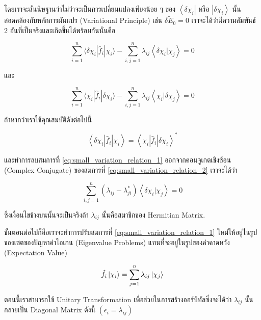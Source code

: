 \noindent โดยเราจะสันนิษฐานว่าไม่ว่าจะเป็นการเปลี่ยนแปลงเพียงน้อย ๆ ของ $\left\langle\delta \chi_i\right|$ หรือ
$\left|\delta \chi_i\right\rangle$ นั้นสอดคล้องกับหลักการผันแปร (Variational Principle) เช่น $\delta \tilde{E}_0=0$
เราจะได้ว่ามีความสัมพันธ์ 2 อันที่เป็นจริงและเกิดขึ้นได้พร้อมกันนั่นคือ

\begin{equation}
    \label{eq:small_variation_relation_1}
    \sum_{i=1}^n \langle\delta \chi_i | \hat{f}_i | \chi_i \rangle
    - \sum_{i, j=1}^n \lambda_{i j}\left\langle\delta \chi_i | \chi_j\right\rangle
    = 0
\end{equation}

\noindent และ

\begin{equation}
    \label{eq:small_variation_relation_2}
    \sum_{i=1}^n \langle\chi_i | \hat{f}_i | \delta \chi_i \rangle
    - \sum_{i, j=1}^n \lambda_{i j}\left\langle\chi_i | \delta \chi_j\right\rangle
    = 0
\end{equation}

ถ้าหากว่าเราใช้คุณสมบัติดังต่อไปนี้

\begin{equation}
    \left\langle\delta \chi_i\left|\hat{f}_i\right| \chi_i\right\rangle
    =
    \left\langle\chi_i\left|\hat{f}_i\right| \delta \chi_i\right\rangle^*
\end{equation}

\noindent และทำการลบสมการที่ \ref{eq:small_variation_relation_1} ออกจากคอนจูเกตเชิงซ้อน (Complex Conjugate) ของสมการที่
\ref{eq:small_variation_relation_2} เราจะได้ว่า

\begin{equation}
    \sum_{i, j=1}^n
    \left(\lambda_{i j}-\lambda_{j i}^*\right)
    \left\langle\delta \chi_i | \chi_j\right\rangle
    = 0
\end{equation}

\noindent ซึ่งเงื่อนไขข้างบนนั้นจะเป็นจริงถ้า $\lambda_{i j}$ นั้นคือสมาชิกของ Hermitian Matrix.

ขั้นตอนต่อไปก็คือเราจะทำการปรับสมการที่ \ref{eq:small_variation_relation_1} ใหม่ให้อยู่ในรูปของเซตของปัญหาค่าไอเกน
(Eigenvalue Problems) แทนที่จะอยู่ในรูปของค่าคาดหวัง (Expectation Value)

\begin{equation}
    \hat{f}_i \ket{\chi_i}
    =
    \sum_{j=1}^{n} \lambda_{i j} \ket{\chi_j}
\end{equation}

ตอนนี้เราสามารถใช้ Unitary Transformation เพื่อช่วยในการสร้างออร์บิทัลซึ่งจะได้ว่า $\lambda_{i j}$ นั้นกลายเป็น Diagonal Matrix
ดังนี้ $(\epsilon_{i} = \lambda_{i j})$

